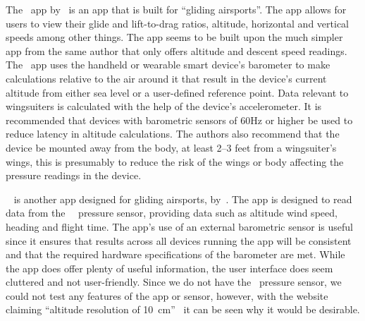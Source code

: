 \documentclass[11pt, twocolumn]{article}
\begin{document}
The~ app by~\textcite{pfm_technologies_llc_l/d_2015} is an app that is built for ``gliding airsports''. The app allows for users to view their glide and lift-to-drag ratios, altitude, horizontal and vertical speeds among other things. The app seems to be built upon the much simpler~ app from the same author that only offers altitude and descent speed readings.
The~ app uses the handheld or wearable smart device's barometer to make calculations relative to the air around it that result in the device's current altitude from either sea level or a user-defined reference point. Data relevant to wingsuiters is calculated with the help of the device's accelerometer. It is recommended that devices with barometric sensors of 60Hz or higher be used to reduce latency in altitude calculations. The authors also recommend that the device be mounted away from the body, at least 2--3 feet from a wingsuiter's wings, this is presumably to reduce the risk of the wings or body affecting the pressure readings in the device.

~ is another app designed for gliding airsports, by~\textcite{dickie_blueflyvario_2016}. The app is designed to read data from the~~\cite{noauthor_blueflyvario_nodate} pressure sensor, providing data such as altitude wind speed, heading and flight time.
The app's use of an external barometric sensor is useful since it ensures that results across all devices running the app will be consistent and that the required hardware specifications of the barometer are met.
While the app does offer plenty of useful information, the user interface does seem cluttered and not user-friendly. Since we do not have the~ pressure sensor, we could not test any features of the app or sensor, however, with the website claiming ``altitude resolution of \SI{10}{\centi\metre}''~\cite{noauthor_blueflyvario_nodate} it can be seen why it would be desirable.
\end{document}
